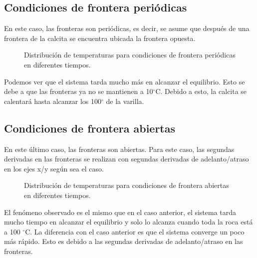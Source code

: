 \documentclass{article}
\begin{document}
\subsection*{Condiciones de frontera periódicas}
En este caso, las fronteras son periódicas, es decir, se asume que después de una frontera de la calcita se encuentra ubicada la frontera opuesta.
\begin{figure}[H]
    \centering
    \label{fig:my_label}
\end{figure}
\begin{figure}[H]
    \centering 
   \caption{Distribución de temperaturas para condiciones de frontera periódicas en diferentes tiempos.}
    \label{fig:my_label}
\end{figure}

Podemos ver que el sistema tarda mucho más en alcanzar el equilibrio. Esto se debe a que las fronteras ya no se mantienen a 10$^\circ$C. Debido a esto, la calcita se calentará hasta alcanzar los 100$^\circ$ de la varilla.

\subsection*{Condiciones de frontera abiertas}
En este último caso, las fronteras son abiertas. Para este caso, las segundas derivadas en las fronteras se realizan con segundas derivadas de adelanto/atraso en los ejes x/y según sea el caso.
\begin{figure}[H]
    \centering
    \label{fig:my_label}
\end{figure}
\begin{figure}[H]
    \centering 
   \caption{Distribución de temperaturas para condiciones de frontera abiertas en diferentes tiempos.}
    \label{fig:my_label}
\end{figure}

El fenómeno observado es el mismo que en el caso anterior, el sistema tarda mucho tiempo en alcanzar el equilibrio y solo lo alcanza cuando toda la roca está a 100 $^\circ$C. La diferencia con el caso anterior es que el sistema converge un poco más rápido. Esto es debido a las segundas derivadas de adelanto/atraso en las fronteras.
\end{document}
